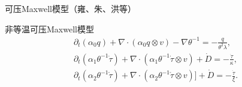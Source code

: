 \documentclass[mathserif]{beamer}
\begin{document}
	

	\begin{frame}{可压Maxwell模型（雍、朱、洪等）}
	\pause
	\begin{block}{非等温可压Maxwell模型}
	\begin{subequations}%
		\begin{align*}
			\partial_t ( \alpha_0  q) +  \nabla \cdot (\alpha_0 q \otimes v) - \nabla \theta^{-1} = -\frac{q}{\theta^2 \lambda}, \\
			\partial_t ( \alpha_1 \theta^{-1} \dot{\tau}) + \nabla \cdot (\alpha_1 \theta^{-1} \dot{\tau} \otimes v) + \dot{D} = -\frac{\dot{\tau}}{\kappa}, \\
			\partial_t (\alpha_2 \theta^{-1} \mathring{\tau}) + \nabla \cdot (\alpha_2 \theta^{-1} \mathring{\tau} \otimes v)] + \mathring{D} = -\frac{\dot{\tau}}{\xi}. 
		\end{align*}
	\end{subequations}
	\end{block}
	\end{frame}
\end{document}
